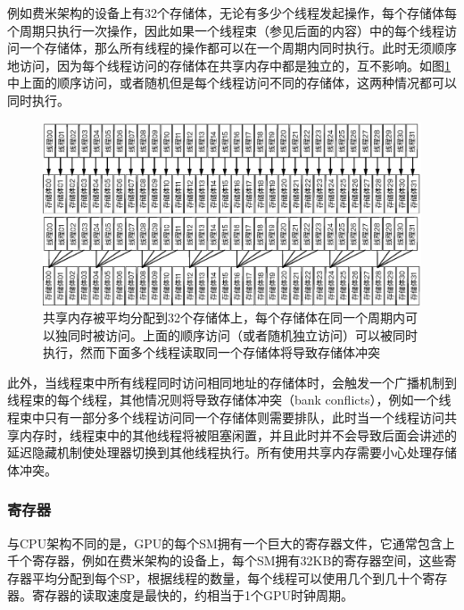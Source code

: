 例如费米架构的设备上有32个存储体，无论有多少个线程发起操作，每个存储体每个周期只执行一次操作，因此如果一个线程束（参见后面的内容）中的每个线程访问一个存储体，那么所有线程的操作都可以在一个周期内同时执行。此时无须顺序地访问，因为每个线程访问的存储体在共享内存中都是独立的，互不影响。如图\ref{f:rp-shared-memory}中上面的顺序访问，或者随机但是每个线程访问不同的存储体，这两种情况都可以同时执行。

\begin{figure}
\begin{fullwidth}
	\includegraphics[width=1.0\thewidth]{figures/rp/shared-memory}
	\caption{共享内存被平均分配到32个存储体上，每个存储体在同一个周期内可以独同时被访问。上面的顺序访问（或者随机独立访问）可以被同时执行，然而下面多个线程读取同一个存储体将导致存储体冲突}
	\label{f:rp-shared-memory}
\end{fullwidth}
\end{figure}

此外，当线程束中所有线程同时访问相同地址的存储体时，会触发一个广播机制到线程束的每个线程，其他情况则将导致存储体冲突（bank conflicts），例如一个线程束中只有一部分多个线程访问同一个存储体则需要排队，此时当一个线程访问共享内存时，线程束中的其他线程将被阻塞闲置，并且此时并不会导致后面会讲述的延迟隐藏机制使处理器切换到其他线程执行。所有使用共享内存需要小心处理存储体冲突。





\subsubsection{寄存器}
与CPU架构不同的是，GPU的每个SM拥有一个巨大的寄存器文件，它通常包含上千个寄存器，例如在费米架构的设备上，每个SM拥有32KB的寄存器空间，这些寄存器平均分配到每个SP，根据线程的数量，每个线程可以使用几个到几十个寄存器。寄存器的读取速度是最快的，约相当于1个GPU时钟周期。

